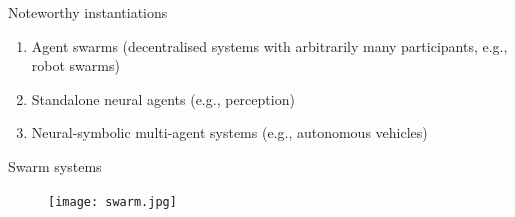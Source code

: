 \documentclass[10pt]{beamer}
\begin{document}
\begin{frame}{Noteworthy instantiations}


\begin{enumerate} \itemsep 3em
	\item Agent swarms  (decentralised systems with
		arbitrarily many participants, e.g., robot swarms)

	\item Standalone neural agents (e.g., perception)

	\item Neural-symbolic multi-agent systems (e.g., autonomous vehicles)
\end{enumerate}

\end{frame}


\begin{frame}{Swarm systems}

\begin{figure}
\centering
\texttt{[image: swarm.jpg]}
\end{figure}

\end{frame}

\end{document}
